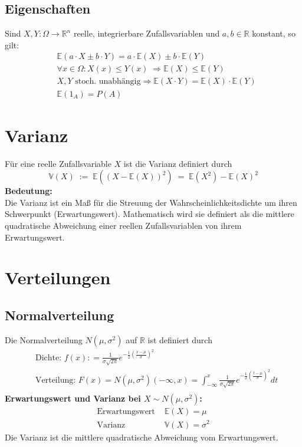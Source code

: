 \documentclass[a4paper]{article}
\begin{document}
\subsection{Eigenschaften}
Sind $X,Y : \Omega \to \mathbb{R}^n$   reelle, integrierbare  Zufallsvariablen und $a,b \in \mathbb{R}$ konstant, so gilt:
\begin{align*}
& \mathbb{E}(a \cdot X \pm b \cdot Y) = a \cdot \mathbb{E}(X) \pm b \cdot \mathbb{E}(Y) \\
& \forall x \in \Omega: X(x) \leq Y(x) \;   \Rightarrow \mathbb{E}(X) \leq \mathbb{E}(Y) \\
& X ,Y \text{ stoch. unabhängig} \Rightarrow   \mathbb{E}(X \cdot Y) =  \mathbb{E}(X) \cdot  \mathbb{E}(Y) \\
& \mathbb{E} (1_A) = P (A)
\end{align*}

\section{Varianz}
Für eine reelle Zufallsvariable $X$ ist die Varianz definiert durch
$$ \mathbb{V} (X) \; := \;  \mathbb{E}( (X - \mathbb{E}(X))^2) \;  = \; \mathbb{E}(X^2) -  \mathbb{E}(X)^2$$
\textbf{Bedeutung:}\\
Die Varianz ist ein Maß für die Streuung der Wahrscheinlichkeitsdichte um ihren Schwerpunkt (Erwartungswert). Mathematisch wird sie definiert als die mittlere quadratische Abweichung einer reellen Zufallsvariablen von ihrem Erwartungswert.

\pagebreak
\section{Verteilungen}

\subsection{Normalverteilung}
Die Normalverteilung $N{(\mu,\sigma^2)}$ auf $\mathbb{R}$ ist definiert durch
\begin{align*}
& \text{Dichte: } f (x) : = \frac 1{\sigma \sqrt{2\pi}}e^{- \frac {1}{2} (\frac{x- \mu}{ \sigma})^2} \\
&  \text{Verteilung: } F(x) = N{(\mu,\sigma^2)}(-\infty , x) =  \int_{-\infty}^{x}  \frac 1{\sigma \sqrt{2\pi}}e^{- \frac {1}{2} (\frac{t- \mu}{ \sigma})^2}dt\\
\end{align*}
\textbf{Erwartungswert und Varianz bei $X \sim N(\mu, \sigma^2)$:}
\begin{align*}
\text{Erwartungswert } & \mathbb{E}(X) = \mu \\
\text{Varianz }& \mathbb{V}(X) = \sigma^2
\end{align*}
Die Varianz ist die mittlere quadratische Abweichung vom Erwartungswert. \\
\end{document}
